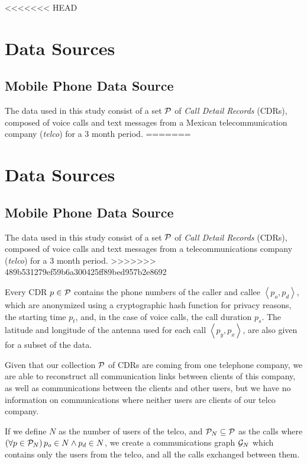 <<<<<<< HEAD
\section{Data Sources}

\subsection{Mobile Phone Data Source}

The data used in this study consist of a set $\mathcal{P}$ of \textit{Call Detail Records} (CDRs), composed of voice calls and text messages from a Mexican telecommunication company (\textit{telco}) for a 3 month period.
=======
\section{Data Sources}\label{data_sources}

\subsection{Mobile Phone Data Source}

The data used in this study consist of a set $\mathcal{P}$ of \textit{Call Detail Records} (CDRs), composed of voice calls and text messages from a telecommunications company (\textit{telco}) for a 3 month period.
>>>>>>> 489b531279ef59b6a300425ff89bed957b2e8692

Every CDR $p \in \mathcal{P}$ contains the phone numbers of the caller and callee $\left< p_o, p_d \right>$, which are anonymized using a cryptographic hash function for privacy reasons, the starting time $p_t$, and, in the case of voice calls, the call duration $p_s$. The latitude and longitude of the antenna used for each call $\left< p_y, p_x \right>$, are also given for a subset of the data.

Given that our collection $\mathcal{P}$ of CDRs are coming from one telephone company, we are able to reconstruct all communication links between clients of this company, as well as communications between the clients and other users, but we have no information on communications where neither users are clients of our telco company.

If we define $N$ as the number of users of the telco, and $\mathcal{P}_N \subseteq \mathcal{P}$ as the calls where $\left( \forall p \in \mathcal{P}_N \right) p_o \in N \wedge p_d \in N$, we create a communications graph $\mathcal{G}_N$ which contains only the users from the telco, and all the calls exchanged between them.

